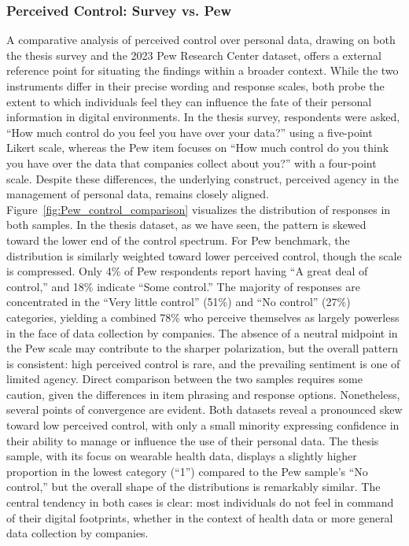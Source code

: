 	\subsubsection{Perceived Control: Survey vs. Pew}
		A comparative analysis of perceived control over personal data, drawing on both the thesis survey and the 2023 Pew Research Center dataset, offers a external reference point for situating the findings within a broader context. While the two instruments differ in their precise wording and response scales, both probe the extent to which individuals feel they can influence the fate of their personal information in digital environments. In the thesis survey, respondents were asked, “How much control do you feel you have over your data?” using a five-point Likert scale, whereas the Pew item focuses on “How much control do you think you have over the data that companies collect about you?” with a four-point scale. Despite these differences, the underlying construct, perceived agency in the management of personal data, remains closely aligned.
		Figure~\ref{fig:Pew_control_comparison} visualizes the distribution of responses in both samples. In the thesis dataset, as we have seen, the pattern is skewed toward the lower end of the control spectrum.			
		For Pew benchmark, the distribution is similarly weighted toward lower perceived control, though the scale is compressed. Only 4\% of Pew respondents report having “A great deal of control,” and 18\% indicate “Some control.” The majority of responses are concentrated in the “Very little control” (51\%) and “No control” (27\%) categories, yielding a combined 78\% who perceive themselves as largely powerless in the face of data collection by companies. The absence of a neutral midpoint in the Pew scale may contribute to the sharper polarization, but the overall pattern is consistent: high perceived control is rare, and the prevailing sentiment is one of limited agency.
		Direct comparison between the two samples requires some caution, given the differences in item phrasing and response options. Nonetheless, several points of convergence are evident. Both datasets reveal a pronounced skew toward low perceived control, with only a small minority expressing confidence in their ability to manage or influence the use of their personal data. The thesis sample, with its focus on wearable health data, displays a slightly higher proportion in the lowest category (“1”) compared to the Pew sample’s “No control,” but the overall shape of the distributions is remarkably similar. The central tendency in both cases is clear: most individuals do not feel in command of their digital footprints, whether in the context of health data or more general data collection by companies.
